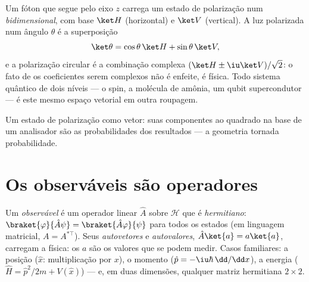 \begin{example}\label{ex:b3:quantum-formalism:polarization}
Um fóton que segue pelo eixo $z$ carrega um estado de polarização num
 \emph{bidimensional}, com base $\ket H$
(horizontal) e $\ket V$ (vertical). A luz polarizada num ângulo
$\theta$ é a superposição
\[
\ket\theta = \cos\theta\,\ket H + \sin\theta\,\ket V ,
\]
e a polarização circular é a combinação complexa $(\ket H \pm
\iu\ket V)/\sqrt2$: o fato de os coeficientes serem complexos não é
enfeite, é física. Todo sistema quântico de dois níveis --- o spin, a
molécula de amônia, um qubit supercondutor --- é este mesmo espaço
vetorial em outra roupagem.
\end{example}

\begin{omfigure}

{\small Um estado de polarização como vetor: suas componentes ao
quadrado na base de um analisador são as probabilidades dos resultados
--- a geometria tornada probabilidade.}
\end{omfigure}

\section{Os observáveis são operadores}

\begin{definition}[Observáveis]\label{def:b3:quantum-formalism:observable}
Um \emph{observável} é um operador linear $\hat A$ sobre $\mathcal H$
que é \emph{hermitiano}: $\braket{\varphi}{\hat A\psi} =
\braket{\hat A\varphi}{\psi}$ para todos os estados (em linguagem
matricial, $A = A^{*\top}$). Seus \emph{autovetores} e
\emph{autovalores}, $\hat A\ket{a} = a\ket{a}$, carregam a física: os
$a$ são os valores que se podem medir. Casos familiares: a posição
($\hat x$: multiplicação por $x$), o momento
($\hat p = -\iu\hbar\,\dd/\dd x$), a energia
($\hat H = \hat p^2/2m + V(\hat x)$) --- e, em duas dimensões,
qualquer matriz hermitiana $2\times2$.
\end{definition}

